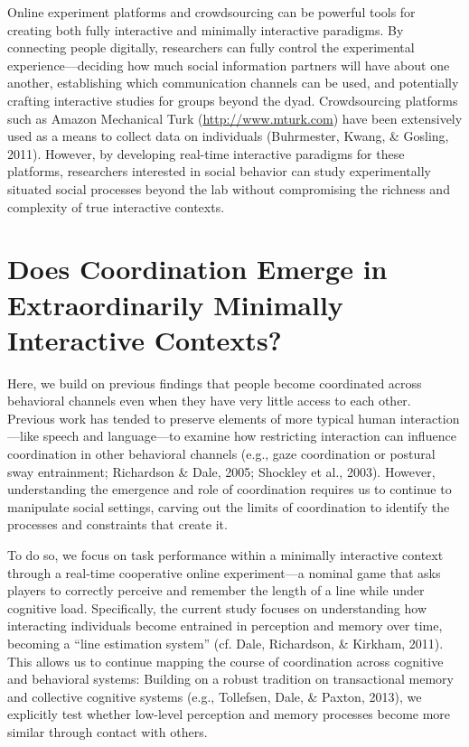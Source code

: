 \documentclass[10pt, letterpaper]{article}
\begin{document}
Online experiment platforms and crowdsourcing can be powerful tools for
creating both fully interactive and minimally interactive paradigms. By
connecting people digitally, researchers can fully control the
experimental experience---deciding how much social information partners
will have about one another, establishing which communication channels
can be used, and potentially crafting interactive studies for groups
beyond the dyad. Crowdsourcing platforms such as Amazon Mechanical Turk
(\url{http://www.mturk.com}) have been extensively used as a means to
collect data on individuals (Buhrmester, Kwang, \& Gosling, 2011).
However, by developing real-time interactive paradigms for these
platforms, researchers interested in social behavior can study
experimentally situated social processes beyond the lab without
compromising the richness and complexity of true interactive contexts.

\section{Does Coordination Emerge in Extraordinarily Minimally
Interactive
Contexts?}\label{does-coordination-emerge-in-extraordinarily-minimally-interactive-contexts}

Here, we build on previous findings that people become coordinated
across behavioral channels even when they have very little access to
each other. Previous work has tended to preserve elements of more
typical human interaction---like speech and language---to examine how
restricting interaction can influence coordination in other behavioral
channels (e.g., gaze coordination or postural sway entrainment;
Richardson \& Dale, 2005; Shockley et al., 2003). However, understanding
the emergence and role of coordination requires us to continue to
manipulate social settings, carving out the limits of coordination to
identify the processes and constraints that create it.

To do so, we focus on task performance within a minimally interactive
context through a real-time cooperative online experiment---a nominal
game that asks players to correctly perceive and remember the length of
a line while under cognitive load. Specifically, the current study
focuses on understanding how interacting individuals become entrained in
perception and memory over time, becoming a ``line estimation system''
(cf. Dale, Richardson, \& Kirkham, 2011). This allows us to continue
mapping the course of coordination across cognitive and behavioral
systems: Building on a robust tradition on transactional memory and
collective cognitive systems (e.g., Tollefsen, Dale, \& Paxton, 2013),
we explicitly test whether low-level perception and memory processes
become more similar through contact with others.
\end{document}

